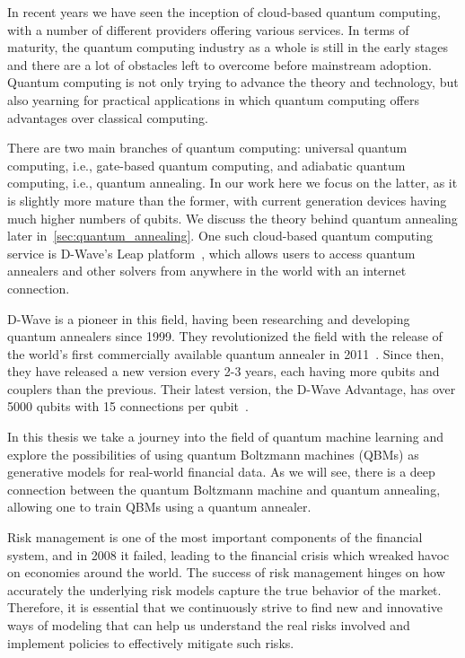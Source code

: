 In recent years we have seen the inception of cloud-based quantum computing, with a number of different providers offering various services.
In terms of maturity, the quantum computing industry as a whole is still in the early stages and there are a lot of obstacles left to overcome before mainstream adoption.
Quantum computing is not only trying to advance the theory and technology, but also yearning for practical applications in which quantum computing offers advantages over classical computing.

There are two main branches of quantum computing: universal quantum computing, i.e., gate-based quantum computing, and adiabatic quantum computing, i.e., quantum annealing.
In our work here we focus on the latter, as it is slightly more mature than the former, with current generation devices having much higher numbers of qubits.
We discuss the theory behind quantum annealing later in~\cref{sec:quantum_annealing}.
One such cloud-based quantum computing service is D-Wave's Leap platform~\cite{dwave_leap}, which allows users to access quantum annealers and other solvers from anywhere in the world with an internet connection.

D-Wave is a pioneer in this field, having been researching and developing quantum annealers since 1999.
They revolutionized the field with the release of the world's first commercially available quantum annealer in 2011~\cite{zyga_2011}.
Since then, they have released a new version every 2-3 years, each having more qubits and couplers than the previous.
Their latest version, the D-Wave Advantage, has over 5000 qubits with 15 connections per qubit~\cite{dwave_advantage}.

In this thesis we take a journey into the field of quantum machine learning and explore the possibilities of using quantum Boltzmann machines (QBMs) as generative models for real-world financial data.
As we will see, there is a deep connection between the quantum Boltzmann machine and quantum annealing, allowing one to train QBMs using a quantum annealer.

Risk management is one of the most important components of the financial system, and in 2008 it failed, leading to the financial crisis which wreaked havoc on economies around the world.
The success of risk management hinges on how accurately the underlying risk models capture the true behavior of the market.
Therefore, it is essential that we continuously strive to find new and innovative ways of modeling that can help us understand the real risks involved and implement policies to effectively mitigate such risks.

